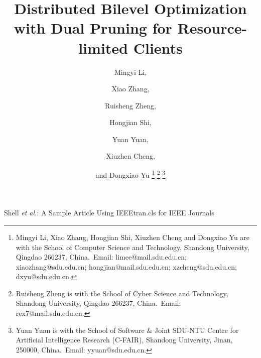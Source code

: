 \documentclass[lettersize,journal]{IEEEtran}
\begin{document}
\title{Distributed Bilevel Optimization with Dual Pruning for Resource-limited Clients}


\author{Mingyi Li, \and Xiao Zhang, \and Ruisheng Zheng, \and Hongjian Shi, \and Yuan Yuan, \and Xiuzhen Cheng, \and and Dongxiao Yu
\thanks{Mingyi Li, Xiao Zhang, Hongjian Shi, Xiuzhen Cheng and Dongxiao Yu are with the School of Computer Science and Technology, Shandong University, Qingdao 266237, China.\protect ~Email: limee@mail.sdu.edu.cn; xiaozhang@sdu.edu.cn; hongjian@mail.sdu.edu.cn; xzcheng@sdu.edu.cn; dxyu@sdu.edu.cn.}
\thanks{Ruisheng Zheng is with the School of Cyber Science and Technology, Shandong University, Qingdao 266237, China.\protect ~Email: rex7@mail.sdu.edu.cn.}
\thanks{Yuan Yuan is with the School of Software $\&$ Joint SDU-NTU Centre for Artificial Intelligence Research (C-FAIR), Shandong University, Jinan, 250000, China.\protect ~Email: yyuan@sdu.edu.cn.}}

%
{Shell \MakeLowercase{\textit{et al.}}: A Sample Article Using IEEEtran.cls for IEEE Journals}


\maketitle
\end{document}
